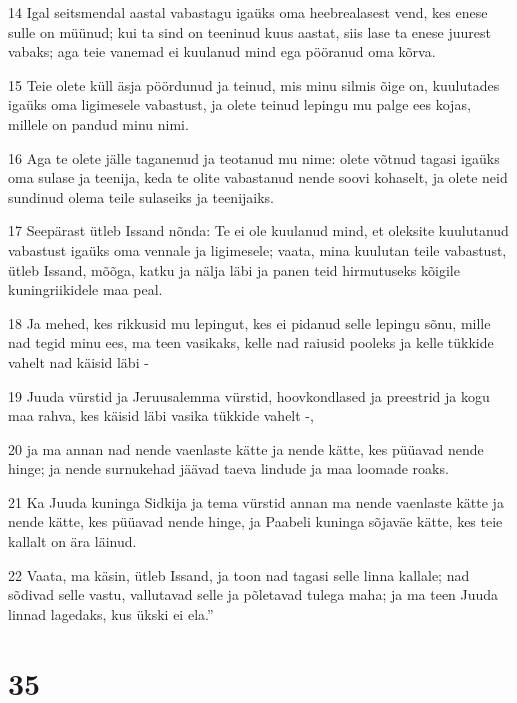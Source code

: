 \par 14 Igal seitsmendal aastal vabastagu igaüks oma heebrealasest vend, kes enese sulle on müünud; kui ta sind on teeninud kuus aastat, siis lase ta enese juurest vabaks; aga teie vanemad ei kuulanud mind ega pööranud oma kõrva.
\par 15 Teie olete küll äsja pöördunud ja teinud, mis minu silmis õige on, kuulutades igaüks oma ligimesele vabastust, ja olete teinud lepingu mu palge ees kojas, millele on pandud minu nimi.
\par 16 Aga te olete jälle taganenud ja teotanud mu nime: olete võtnud tagasi igaüks oma sulase ja teenija, keda te olite vabastanud nende soovi kohaselt, ja olete neid sundinud olema teile sulaseiks ja teenijaiks.
\par 17 Seepärast ütleb Issand nõnda: Te ei ole kuulanud mind, et oleksite kuulutanud vabastust igaüks oma vennale ja ligimesele; vaata, mina kuulutan teile vabastust, ütleb Issand, mõõga, katku ja nälja läbi ja panen teid hirmutuseks kõigile kuningriikidele maa peal.
\par 18 Ja mehed, kes rikkusid mu lepingut, kes ei pidanud selle lepingu sõnu, mille nad tegid minu ees, ma teen vasikaks, kelle nad raiusid pooleks ja kelle tükkide vahelt nad käisid läbi -
\par 19 Juuda vürstid ja Jeruusalemma vürstid, hoovkondlased ja preestrid ja kogu maa rahva, kes käisid läbi vasika tükkide vahelt -,
\par 20 ja ma annan nad nende vaenlaste kätte ja nende kätte, kes püüavad nende hinge; ja nende surnukehad jäävad taeva lindude ja maa loomade roaks.
\par 21 Ka Juuda kuninga Sidkija ja tema vürstid annan ma nende vaenlaste kätte ja nende kätte, kes püüavad nende hinge, ja Paabeli kuninga sõjaväe kätte, kes teie kallalt on ära läinud.
\par 22 Vaata, ma käsin, ütleb Issand, ja toon nad tagasi selle linna kallale; nad sõdivad selle vastu, vallutavad selle ja põletavad tulega maha; ja ma teen Juuda linnad lagedaks, kus ükski ei ela.”

\chapter{35}

